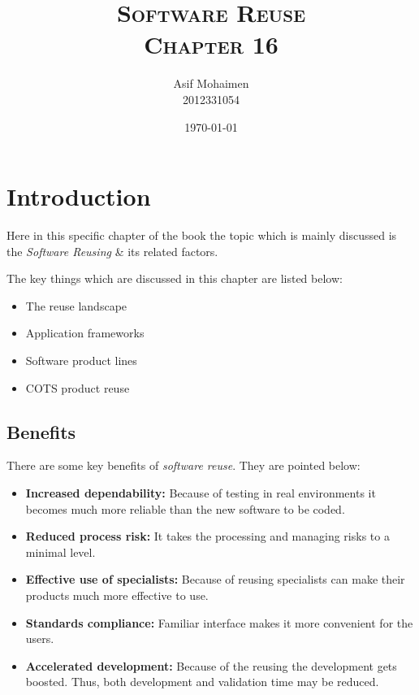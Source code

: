\documentclass[dvips,12pt]{article}
\begin{document}
\chead{\thepage}

\title{
  \textsc{\textbf{Software Reuse}\\
  Chapter 16}
}
\author{
  Asif Mohaimen\\
  2012331054\\
}
\date{\today}

\maketitle


\section{Introduction} \label{introduction}
Here in this specific chapter of the book the topic which is mainly discussed is the \emph{Software Reusing} \& it\textquotesingle s related factors.

The key things which are discussed in this chapter are listed below:
\begin{itemize}
\item The reuse landscape 
\item Application frameworks
\item Software product lines
\item COTS product reuse
\end{itemize}

\subsection{Benefits}
There are some key benefits of \emph{software reuse}. They are pointed below:
\begin{itemize}
\item \textbf{Increased dependability:} Because of testing in real environments it becomes much more reliable than the new software to be coded.
\item \textbf{Reduced process risk:} It takes the processing and managing risks to a minimal level.
\item \textbf{Effective use of specialists:} Because of reusing specialists can make their products much more effective to use.
\item \textbf{Standards compliance:}  Familiar interface makes it more convenient for the users.
\item \textbf{Accelerated development:} Because of the reusing the development gets boosted. Thus, both development and validation time may be reduced.
\end{itemize}
\end{document}
